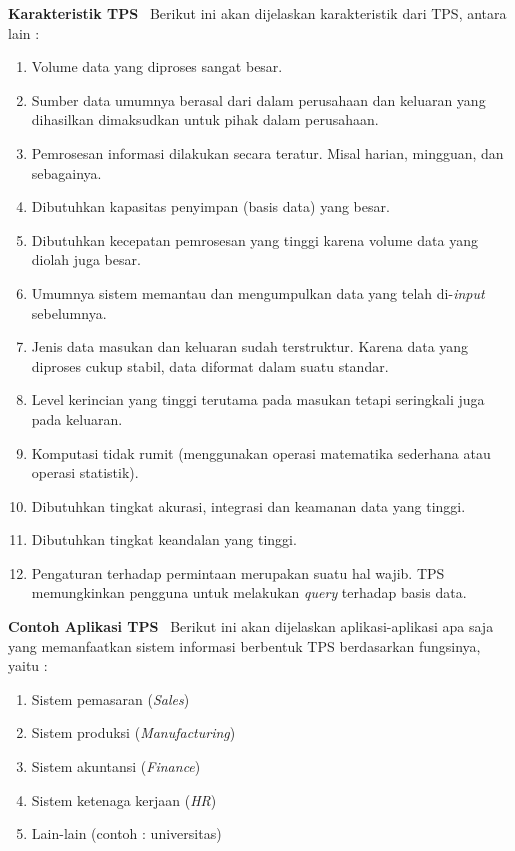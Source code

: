 \textbf{Karakteristik TPS}\
\label{sec:karakteristik_tps}
Berikut ini akan dijelaskan karakteristik dari TPS, antara lain \cite{Turban:2001} : 
\begin{enumerate}
	\item Volume data yang diproses sangat besar.
	\item Sumber data umumnya berasal dari dalam perusahaan dan keluaran yang dihasilkan dimaksudkan untuk pihak dalam perusahaan.
	\item Pemrosesan informasi dilakukan secara teratur. Misal harian, mingguan, dan sebagainya.
	\item Dibutuhkan kapasitas penyimpan (basis data) yang besar.
	\item Dibutuhkan kecepatan pemrosesan yang tinggi karena volume data yang diolah juga besar.
	\item Umumnya sistem memantau dan mengumpulkan data yang telah di-\textit{input} sebelumnya.
	\item Jenis data masukan dan keluaran sudah terstruktur. Karena data yang diproses cukup stabil, data diformat dalam suatu standar.
	\item Level kerincian yang tinggi terutama pada masukan tetapi seringkali juga pada keluaran.
	\item Komputasi tidak rumit (menggunakan operasi matematika sederhana atau operasi statistik).
	\item Dibutuhkan tingkat akurasi, integrasi dan keamanan data yang tinggi.
	\item Dibutuhkan tingkat keandalan yang tinggi.
	\item Pengaturan terhadap permintaan merupakan suatu hal wajib. TPS memungkinkan pengguna untuk melakukan \textit{query} terhadap basis data.
\end{enumerate}

\textbf{Contoh Aplikasi TPS}\
\label{sec:contoh_aplikasi _tps}
Berikut ini akan dijelaskan aplikasi-aplikasi apa saja yang memanfaatkan sistem informasi berbentuk TPS berdasarkan fungsinya, yaitu \cite{Laudon:1996} :
\begin{enumerate}
	\item Sistem pemasaran (\textit{Sales})
	\item Sistem produksi (\textit{Manufacturing})
	\item Sistem akuntansi (\textit{Finance})
	\item Sistem ketenaga kerjaan (\textit{HR})
	\item Lain-lain (contoh : universitas)
\end{enumerate}


